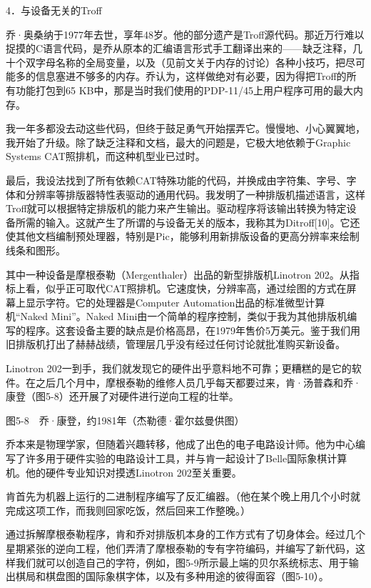 \documentclass[a4paper,12pt,UTF8,twoside]{ctexbook}
\begin{document}
{{4．与设备无关的Troff


乔·奥桑纳于1977年去世，享年48岁。他的部分遗产是Troff源代码。那近万行难以捉摸的C语言代码，是乔从原本的汇编语言形式手工翻译出来的——缺乏注释，几十个双字母名称的全局变量，以及（见前文关于内存的讨论）各种小技巧，把尽可能多的信息塞进不够多的内存。乔认为，这样做绝对有必要，因为得把Troff的所有功能打包到65 KB中，那是当时我们使用的PDP-11/45上用户程序可用的最大内存。

我一年多都没去动这些代码，但终于鼓足勇气开始摆弄它。慢慢地、小心翼翼地，我开始了升级。除了缺乏注释和文档，最大的问题是，它极大地依赖于Graphic Systems CAT照排机，而这种机型业已过时。

最后，我设法找到了所有依赖CAT特殊功能的代码，并换成由字符集、字号、字体和分辨率等排版器特性表驱动的通用代码。我发明了一种排版机描述语言，这样Troff就可以根据特定排版机的能力来产生输出。驱动程序将该输出转换为特定设备所需的输入。这就产生了所谓的与设备无关的版本，我称其为Ditroff[10]。它还使其他文档编制预处理器，特别是Pic，能够利用新排版设备的更高分辨率来绘制线条和图形。

其中一种设备是摩根泰勒（Mergenthaler）出品的新型排版机Linotron 202。从指标上看，似乎正可取代CAT照排机。它速度快，分辨率高，通过绘图的方式在屏幕上显示字符。它的处理器是Computer Automation出品的标准微型计算机“Naked Mini”。Naked Mini由一个简单的程序控制，类似于我为其他排版机编写的程序。这套设备主要的缺点是价格高昂，在1979年售价5万美元。鉴于我们用旧排版机打出了赫赫战绩，管理层几乎没有经过任何讨论就批准购买新设备。

Linotron 202一到手，我们就发现它的硬件出乎意料地不可靠；更糟糕的是它的软件。在之后几个月中，摩根泰勒的维修人员几乎每天都要过来，肯·汤普森和乔·康登（图5-8）还开展了对硬件进行逆向工程的壮举。



图5-8　乔·康登，约1981年（杰勒德·霍尔兹曼供图）

乔本来是物理学家，但随着兴趣转移，他成了出色的电子电路设计师。他为中心编写了许多用于硬件实验的电路设计工具，并与肯一起设计了Belle国际象棋计算机。他的硬件专业知识对摸透Linotron 202至关重要。

肯首先为机器上运行的二进制程序编写了反汇编器。（他在某个晚上用几个小时就完成这项工作，而我则回家吃饭，然后回来工作整晚。）

通过拆解摩根泰勒程序，肯和乔对排版机本身的工作方式有了切身体会。经过几个星期紧张的逆向工程，他们弄清了摩根泰勒的专有字符编码，并编写了新代码，这样我们就可以创造自己的字符，例如，图5-9所示最上端的贝尔系统标志、用于输出棋局和棋盘图的国际象棋字体，以及有多种用途的彼得面容（图5-10）。



}}
\end{document}
